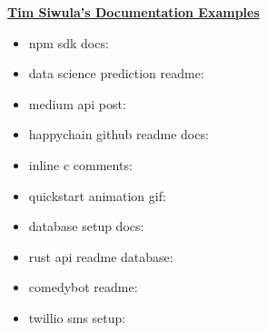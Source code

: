 \documentclass{article}
\newcommand{\MYhref}[3][blue]{\href{#2}{\color{#1}{#3}}}%
\begin{document}
\textbf{\href{}{\Large Tim Siwula's Documentation Examples}}


\begin{itemize}

\item npm sdk docs: \MYhref{https://www.npmjs.com/package/happychain}{link}
\item data science prediction readme: \MYhref{https://github.com/timxor/click_prediction}{link}
\item medium api post: \MYhref{https://medium.com/happychainapi/our-alpha-sandbox-payment-api-for-ethereum-applications-is-now-live-f2adbe5e05ae}{link}
\item happychain github readme docs: \MYhref{https://github.com/HappyChainAPI/express-happychain#getting-started-with-happychain-npm-module}{link}
\item inline c comments: \MYhref{https://github.com/timxor/c_code/blob/master/cs220/fall_2015/projects/p3/mpi_dijkstra.c}{link}
\item quickstart animation gif: \MYhref{https://github.com/timxor/happy-ens#with-happy-ens-you-can-resolve-your-mydomaineth-addresses-in-your-browser-without-any-third-party-plugins}{link}
\item database setup docs: \MYhref{https://github.com/timxor/payment-api#download-and-install-dependencies}{link}
\item rust api readme database: \MYhref{https://github.com/timxor/payment-api#download-and-install-dependencies}{link}
\item comedybot readme: \MYhref{https://github.com/timxor/messenger_chatbot#messenger_chatbot}{link}
\item twillio sms setup: \MYhref{https://github.com/timxor/sms-text-chatbot#send-a-sms-text-to-720-336-4682}{link}

























\end{itemize}
\end{document}

